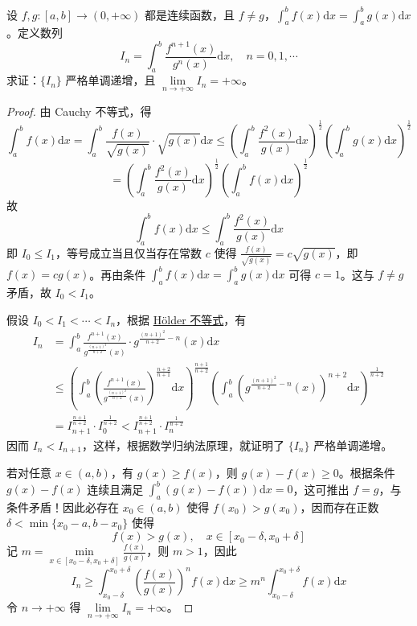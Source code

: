 \documentclass[../../main.tex]{subfiles}%
\begin{document}
\begin{example}
设 \( f,g:[a,b]\to(0,+\infty) \) 都是连续函数，且 \( f\neq g \)，\( \int_{a}^{b}f(x)\mathrm{d}x = \int_{a}^{b}g(x)\mathrm{d}x \)。定义数列
\[
I_{n}=\int_{a}^{b}\frac{f^{n + 1}(x)}{g^{n}(x)}\mathrm{d}x,\quad n = 0,1,\cdots
\]
求证：\(\{I_{n}\}\) 严格单调递增，且 \(\lim\limits_{n\to+\infty}I_{n}=+\infty\)。
\end{example}
\begin{proof}
由 Cauchy 不等式，得
\[
\int_{a}^{b}f(x)\mathrm{d}x=\int_{a}^{b}\frac{f(x)}{\sqrt{g(x)}}\cdot\sqrt{g(x)}\mathrm{d}x\leqslant\left(\int_{a}^{b}\frac{f^{2}(x)}{g(x)}\mathrm{d}x\right)^{\frac{1}{2}}\left(\int_{a}^{b}g(x)\mathrm{d}x\right)^{\frac{1}{2}}
\]
\[
=\left(\int_{a}^{b}\frac{f^{2}(x)}{g(x)}\mathrm{d}x\right)^{\frac{1}{2}}\left(\int_{a}^{b}f(x)\mathrm{d}x\right)^{\frac{1}{2}}
\]
故
\[
\int_{a}^{b}f(x)\mathrm{d}x\leqslant\int_{a}^{b}\frac{f^{2}(x)}{g(x)}\mathrm{d}x
\]
即 \(I_{0}\leqslant I_{1}\)，等号成立当且仅当存在常数 \(c\) 使得 \(\frac{f(x)}{\sqrt{g(x)}}=c\sqrt{g(x)}\)，即 \(f(x)=cg(x)\)。再由条件 \(\int_{a}^{b}f(x)\mathrm{d}x=\int_{a}^{b}g(x)\mathrm{d}x\) 可得 \(c = 1\)。这与 \(f\neq g\) 矛盾，故 \(I_{0}<I_{1}\)。

假设 \(I_{0}<I_{1}<\cdots<I_{n}\)，根据 \hyperref[theorem:Hölder(H\"older)不等式(积分形式)]{Hölder 不等式}，有
\begin{align*}
I_{n}&=\int_{a}^{b}\frac{f^{n + 1}(x)}{g^{\frac{(n + 1)^{2}}{n + 2}}(x)}\cdot g^{\frac{(n + 1)^{2}}{n + 2}-n}(x)\mathrm{d}x
\\
&\leqslant\left(\int_{a}^{b}\left(\frac{f^{n + 1}(x)}{g^{\frac{(n + 1)^{2}}{n + 2}}(x)}\right)^{\frac{n + 2}{n + 1}}\mathrm{d}x\right)^{\frac{n + 1}{n + 2}}\left(\int_{a}^{b}\left(g^{\frac{(n + 1)^{2}}{n + 2}-n}(x)\right)^{n + 2}\mathrm{d}x\right)^{\frac{1}{n + 2}}
\\
&=I_{n + 1}^{\frac{n + 1}{n + 2}}\cdot I_{0}^{\frac{1}{n + 2}}<I_{n + 1}^{\frac{n + 1}{n + 2}}\cdot I_{n}^{\frac{1}{n + 2}}
\end{align*}
因而 \(I_{n}<I_{n + 1}\)，这样，根据数学归纳法原理，就证明了 \(\{I_{n}\}\) 严格单调递增。

若对任意 \(x\in(a,b)\)，有 \(g(x)\geqslant f(x)\)，则 \(g(x)-f(x)\geqslant0\)。根据条件 \(g(x)-f(x)\) 连续且满足 \(\int_{a}^{b}(g(x)-f(x))\mathrm{d}x = 0\)，这可推出 \(f = g\)，与条件矛盾！因此必存在 \(x_{0}\in(a,b)\) 使得 \(f(x_{0})>g(x_{0})\)，因而存在正数 \(\delta<\min\{x_{0}-a,b - x_{0}\}\) 使得
\[
f(x)>g(x),\quad x\in[x_{0}-\delta,x_{0}+\delta]
\]
记 \(m=\min\limits_{x\in[x_{0}-\delta,x_{0}+\delta]}\frac{f(x)}{g(x)}\)，则 \(m>1\)，因此
\[
I_{n}\geqslant\int_{x_{0}-\delta}^{x_{0}+\delta}\left(\frac{f(x)}{g(x)}\right)^{n}f(x)\mathrm{d}x\geqslant m^{n}\int_{x_{0}-\delta}^{x_{0}+\delta}f(x)\mathrm{d}x
\]
令 \(n\to+\infty\) 得 \(\lim\limits_{n\to+\infty}I_{n}=+\infty\)。
\end{proof}
\end{document}
